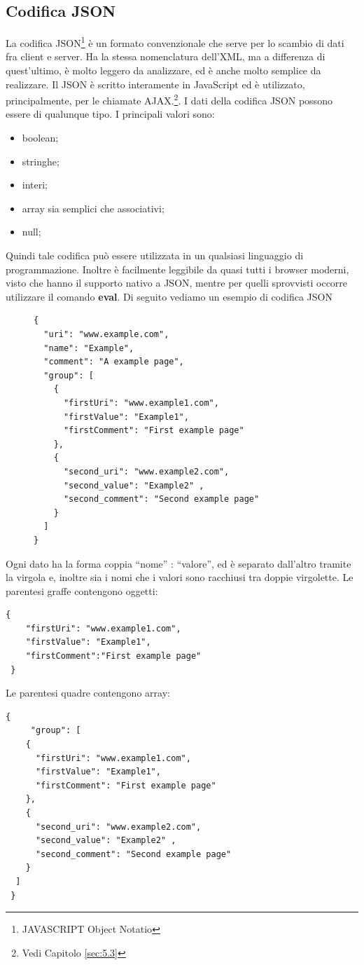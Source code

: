 \documentclass[a4paper,11pt]{article}
\begin{document}
\subsection{Codifica JSON}
\label{sec:5.2}
La codifica JSON\footnote{JAVASCRIPT Object Notatio} è un formato convenzionale che serve per lo scambio di dati fra client e server. Ha la stessa nomenclatura dell'XML, ma  a differenza di quest'ultimo, è molto leggero da analizzare, ed è anche molto semplice da realizzare.
Il JSON è scritto interamente in JavaScript ed è  utilizzato, principalmente, per le chiamate AJAX.\footnote{Vedi Capitolo \ref{sec:5.3}}. I dati della codifica JSON possono essere di qualunque tipo. I principali valori sono:
\begin{itemize}
	\item boolean;
	\item stringhe;
	\item interi; 
	\item array sia semplici che associativi;
	\item null;
\end{itemize} 
Quindi tale codifica può essere utilizzata in un qualsiasi linguaggio di programmazione.
Inoltre è facilmente leggibile da quasi tutti i browser moderni, visto che hanno il supporto nativo a JSON, mentre per quelli sprovvisti occorre utilizzare il comando \textbf{eval}. \newline Di seguito vediamo un esempio di codifica JSON
\begin{figure}[htb]
	\centering
		\begin{lstlisting}[style=htmlcssjs]
{
  "uri": "www.example.com",
  "name": "Example",
  "comment": "A example page",
  "group": [
    {
      "firstUri": "www.example1.com",
      "firstValue": "Example1",
      "firstComment": "First example page"       
    },   
    {
      "second_uri": "www.example2.com",
      "second_value": "Example2" ,
      "second_comment": "Second example page"
    }
  ]
}
		\end{lstlisting}
 \end{figure}\newline
Ogni dato ha la forma coppia ``nome'' : ``valore'', ed è separato dall'altro tramite la virgola e, inoltre sia i nomi che i valori sono racchiusi tra doppie virgolette.\newline
Le parentesi graffe contengono oggetti: \newline 
\begin{lstlisting}[style=htmlcssjs]
{
	"firstUri": "www.example1.com",
	"firstValue": "Example1", 					
	"firstComment":"First example page"  
 } 
\end{lstlisting}
Le parentesi quadre contengono array:
\begin{lstlisting}[style=htmlcssjs]
{
	 "group": [
    {
      "firstUri": "www.example1.com",
      "firstValue": "Example1",
      "firstComment": "First example page"       
    },   
    {
      "second_uri": "www.example2.com",
      "second_value": "Example2" ,
      "second_comment": "Second example page"
    }
  ]  
 } 
\end{lstlisting} 
\end{document}
